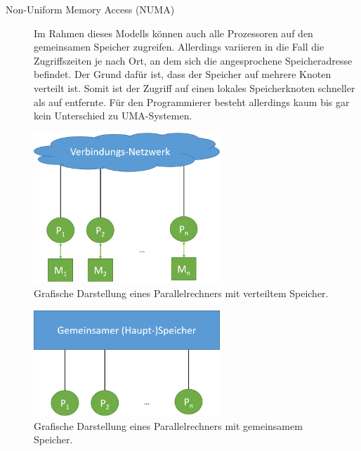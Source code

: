 \begin{description}
\begin{description}
							\item [Non-Uniform Memory Access (NUMA)]
								Im Rahmen dieses Modells können auch alle Prozessoren auf den gemeinsamen Speicher zugreifen. Allerdings variieren in die Fall die Zugriffszeiten je nach Ort, an dem sich die angesprochene Speicheradresse befindet. Der Grund dafür ist, dass der Speicher auf mehrere Knoten verteilt ist. Somit ist der Zugriff auf einen lokales Speicherknoten schneller als auf entfernte. Für den Programmierer besteht allerdings kaum bis gar kein Unterschied zu UMA-Systemen. \cite{EntwicklungParallelerProgramme}
						\end{description}
				\end{description}
			
				\begin{figure}
					\centering	
					\includegraphics[width=7cm]{Abbildungen/Parallelrechner_mit_verteiltem_Speicher.png}
					\caption{Grafische Darstellung eines Parallelrechners mit verteiltem Speicher.}
					\label{fig:ParallelrechnerVerteilterSpeicher}
				\end{figure}
			
				\begin{figure}
					\centering	
					\includegraphics[width=7cm]{Abbildungen/Parallelrechner_mit_gemeinsamem_Speicher.png}
					\caption{Grafische Darstellung eines Parallelrechners mit gemeinsamem Speicher.}
					\label{fig:ParallelrechnerGemeinsamerSpeicher}
				\end{figure}
			
